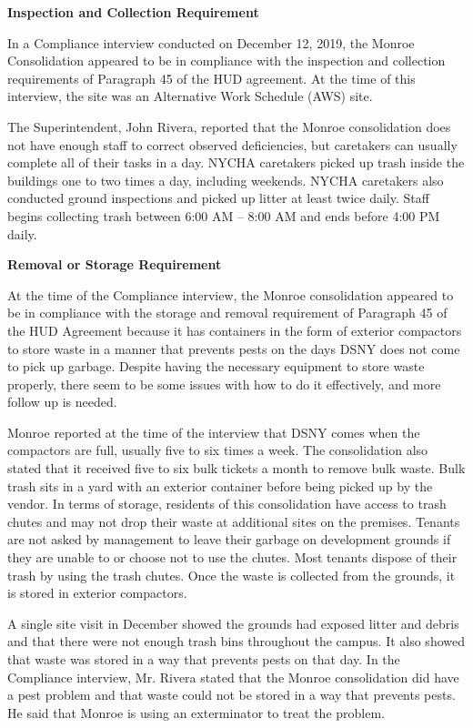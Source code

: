 

\textbf{Inspection and Collection Requirement} 

 

In a Compliance interview conducted on December 12, 2019, the Monroe Consolidation appeared to be in compliance with the inspection and collection requirements of Paragraph 45 of the HUD agreement. At the time of this interview, the site was an Alternative Work Schedule (AWS) site. 

The Superintendent, John Rivera, reported that the Monroe consolidation does not have enough staff to correct observed deficiencies, but caretakers can usually complete all of their tasks in a day. NYCHA caretakers picked up trash inside the buildings one to two times a day, including weekends. NYCHA caretakers also conducted ground inspections and picked up litter at least twice daily. Staff begins collecting trash between 6:00 AM -- 8:00 AM and ends before 4:00 PM daily.

\textbf{Removal or Storage Requirement} 

 

At the time of the Compliance interview, the Monroe consolidation appeared to be in compliance with the storage and removal requirement of Paragraph 45 of the HUD Agreement because it has containers in the form of exterior compactors to store waste in a manner that prevents pests on the days DSNY does not come to pick up garbage. Despite having the necessary equipment to store waste properly, there seem to be some issues with how to do it effectively, and more follow up is needed.

 

Monroe reported at the time of the interview that DSNY comes when the compactors are full, usually five to six times a week. The consolidation also stated that it received five to six bulk tickets a month to remove bulk waste. Bulk trash sits in a yard with an exterior container before being picked up by the vendor. In terms of storage, residents of this consolidation have access to trash chutes and may not drop their waste at additional sites on the premises. Tenants are not asked by management to leave their garbage on development grounds if they are unable to or choose not to use the chutes. Most tenants dispose of their trash by using the trash chutes. Once the waste is collected from the grounds, it is stored in exterior compactors. 

A single site visit in December showed the grounds had exposed litter and debris and that there were not enough trash bins throughout the campus. It also showed that waste was stored in a way that prevents pests on that day. In the Compliance interview, Mr. Rivera stated that the Monroe consolidation did have a pest problem and that waste could not be stored in a way that prevents pests. He said that Monroe is using an exterminator to treat the problem. 

